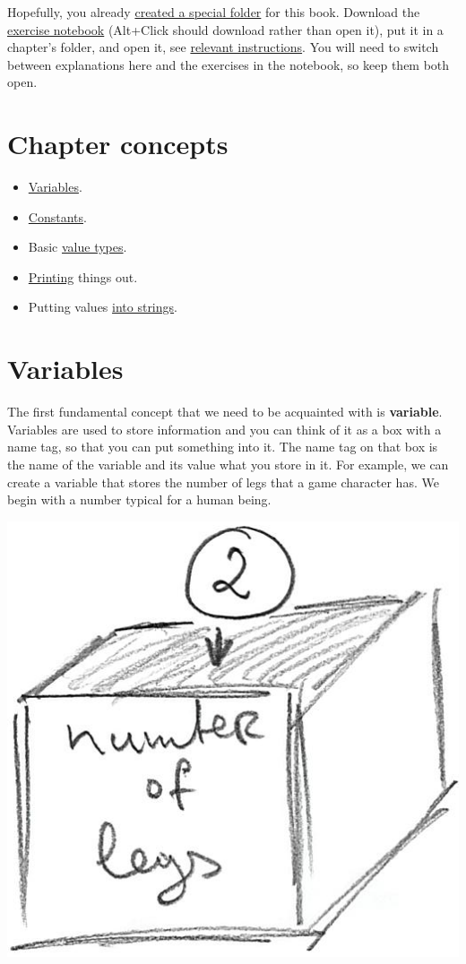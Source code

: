 \documentclass[
]{book}
\providecommand{\tightlist}{%
  \setlength{\itemsep}{0pt}\setlength{\parskip}{0pt}}
\begin{document}
Hopefully, you already \protect\hyperlink{files-folder}{created a special folder} for this book. Download the \href{notebooks/Basics.ipynb}{exercise notebook} (Alt+Click should download rather than open it), put it in a chapter's folder, and open it, see \protect\hyperlink{jupyter-notebooks}{relevant instructions}. You will need to switch between explanations here and the exercises in the notebook, so keep them both open.

\hypertarget{chapter-concepts}{%
\section{Chapter concepts}\label{chapter-concepts}}

\begin{itemize}
\tightlist
\item
  \protect\hyperlink{variables}{Variables}.
\item
  \protect\hyperlink{constants}{Constants}.
\item
  Basic \protect\hyperlink{value-types}{value types}.
\item
  \protect\hyperlink{print}{Printing} things out.
\item
  Putting values \protect\hyperlink{string-formatting}{into strings}.
\end{itemize}

\hypertarget{variables}{%
\section{Variables}\label{variables}}

The first fundamental concept that we need to be acquainted with is \textbf{variable}. Variables are used to store information and you can think of it as a box with a name tag, so that you can put something into it. The name tag on that box is the name of the variable and its value what you store in it. For example, we can create a variable that stores the number of legs that a game character has. We begin with a number typical for a human being.

\begin{center}\includegraphics[width=0.5\linewidth]{images/variable-as-box} \end{center}
\end{document}

